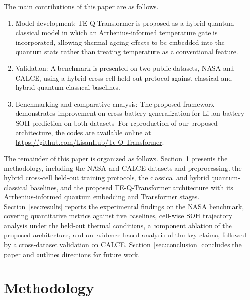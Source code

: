 \documentclass[a4paper,fleqn]{cas-sc}
\begin{document}
The main contributions of this paper are as follows.
\begin{enumerate}[label=(\roman*)]
\item Model development: TE-Q-Transformer is proposed as a hybrid quantum-classical model in which an Arrhenius-informed temperature gate is incorporated, allowing thermal ageing effects to be embedded into the quantum state rather than treating temperature as a conventional feature. 
\item Validation: A benchmark is presented on two public datasets, NASA and CALCE, using a hybrid cross-cell held-out protocol against classical and hybrid quantum-classical baselines.
\item Benchmarking and comparative analysis: The proposed framework demonstrates improvement on cross-battery generalization for Li-ion battery SOH prediction on both datasets. For reproduction of our proposed architecture, the codes are available online at \href{https://github.com/LisanHub/Te-Q-Transformer}{https://github.com/LisanHub/Te-Q-Transformer}.
\end{enumerate}

The remainder of this paper is organized as follows. Section~\ref{sec:method} presents the methodology, including the NASA and CALCE datasets and preprocessing, the hybrid cross-cell held-out training protocols, the classical and hybrid quantum-classical baselines, and the proposed TE-Q-Transformer architecture with its Arrhenius-informed quantum embedding and Transformer stages. Section~\ref{sec:results} reports the experimental findings on the NASA benchmark, covering quantitative metrics against five baselines, cell-wise SOH trajectory analysis under the held-out thermal conditions, a component ablation of the proposed architecture, and an evidence-based analysis of the key claims, followed by a cross-dataset validation on CALCE. Section~\ref{sec:conclusion} concludes the paper and outlines directions for future work.



\section{Methodology}\label{sec:method}
\end{document}
